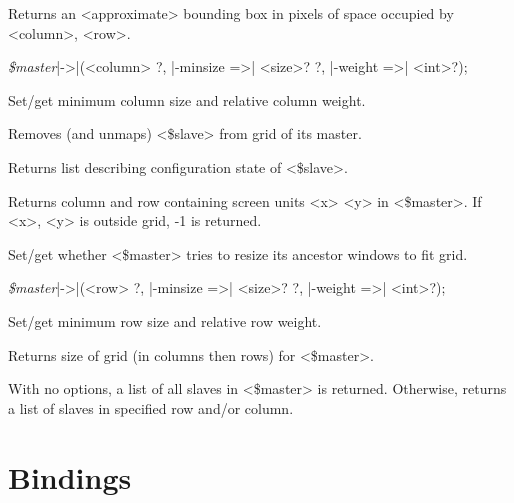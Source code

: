 \begin{enum}{1cm}

Returns an <approximate> bounding box in pixels of space occupied by <column>, <row>.

\item[{\it \$master}|->|\kwd{gridColumnconfigure}(<column> ?, |-minsize =>| <size>?]
  ?, |-weight =>| <int>?);\strut\newline
Set/get minimum column size and relative column weight.

Removes (and unmaps) <\$slave> from grid of its master.

Returns list describing configuration state of <\$slave>.

Returns column and row containing screen units <x> <y> in <\$master>.
If <x>, <y> is outside grid, -1 is returned.

Set/get whether <\$master> tries to resize its ancestor windows to fit grid.

\item[{\it \$master}|->|\kwd{gridRowconfigure}(<row> ?, |-minsize =>| <size>?]
  ?, |-weight =>| <int>?);\strut\newline
Set/get minimum row size and relative row weight.

Returns size of grid (in columns then rows) for <\$master>.

With no options, a list of all slaves in <\$master> is returned.
Otherwise, returns a list of slaves in specified row and/or column.

\end{enum}


\section{Bindings}

